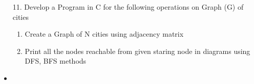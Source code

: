 \documentclass{article}
\newcommand{\answer}{\item [$\rightarrow$]}
\begin{document}
	\begin{itemize}
		\item [11.] Develop a Program in C for the following operations on Graph (G) of cities

		\begin{enumerate}[label=\alph*.]
			\item Create a Graph of N cities using adjacency matrix
			\item Print all the nodes reachable from given staring node in diagrams using DFS, BFS methods
		\end{enumerate}

		\answer \inputminted{c}{../../Program11.c}
	\end{itemize}
\end{document}
